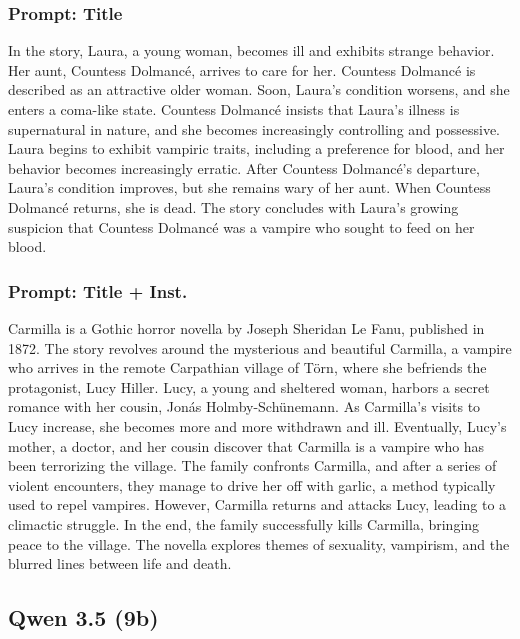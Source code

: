 \documentclass{article} %
\begin{document}
\subsubsection{Prompt: Title}

In the story, Laura, a young woman, becomes ill and exhibits strange behavior. \textcolor{skipred}{Her aunt, Countess Dolmancé, arrives to care for her.} Countess Dolmancé is described as an attractive older woman. Soon, Laura's condition worsens, and she enters a coma-like state. \textcolor{skipred}{Countess Dolmancé insists that Laura's illness is supernatural in nature, and she becomes increasingly controlling and possessive. Laura begins to exhibit vampiric traits, including a preference for blood, and her behavior becomes increasingly erratic. After Countess Dolmancé's departure, Laura's condition improves, but she remains wary of her aunt. When Countess Dolmancé returns, she is dead. The story concludes with Laura's growing suspicion that Countess Dolmancé was a vampire who sought to feed on her blood.}

\subsubsection{Prompt: Title + Inst.}

\textcolor{skipred}{Carmilla is a Gothic horror novella by Joseph Sheridan Le Fanu, published in 1872. The story revolves around the mysterious and beautiful Carmilla, a vampire who arrives in the remote Carpathian village of Törn, where she befriends the protagonist, Lucy Hiller. Lucy, a young and sheltered woman, harbors a secret romance with her cousin, Jonás Holmby-Schünemann.} As Carmilla's visits to Lucy increase, she becomes more and more withdrawn and ill. \textcolor{skipred}{Eventually, Lucy's mother, a doctor, and her cousin discover that Carmilla is a vampire who has been terrorizing the village. The family confronts Carmilla, and after a series of violent encounters, they manage to drive her off with garlic, a method typically used to repel vampires. However, Carmilla returns and attacks Lucy, leading to a climactic struggle.} In the end, the family successfully kills Carmilla, bringing peace to the village. \textcolor{skipred}{The novella explores themes of sexuality, vampirism, and the blurred lines between life and death.}

\subsection{Qwen 3.5 (9b)}
\end{document}
